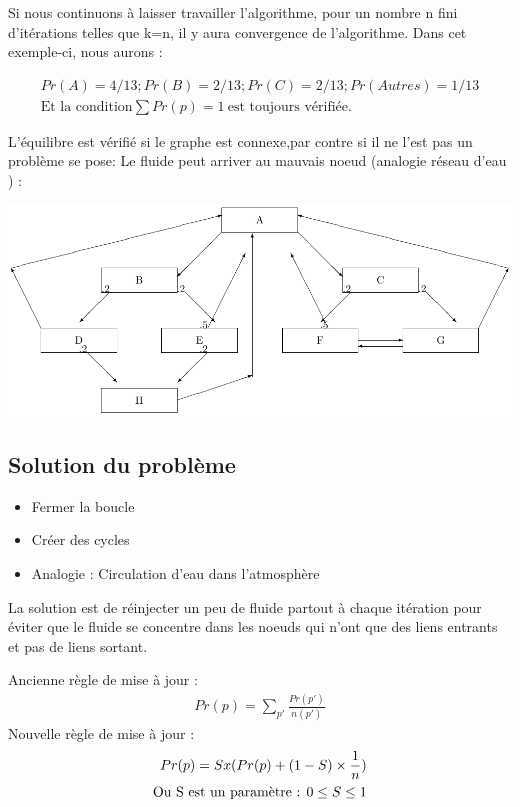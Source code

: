  Si nous continuons à laisser travailler l'algorithme, pour un nombre n fini d'itérations telles que k=n, il y aura convergence de l'algorithme. Dans cet exemple-ci,  nous aurons :

	\begin{align*}
 	Pr(A) = 4/13 ; Pr(B) = 2/13 ; Pr(C) = 2/13 ; Pr(Autres) = 1/13 \\
 	\text{Et la condition} \sum Pr(p) = 1 ~\text{est toujours vérifiée.}
	\end{align*}
 
 L'équilibre est vérifié si le graphe est connexe,par contre si il ne l'est pas un problème se pose: Le fluide peut arriver au mauvais noeud (analogie réseau d'eau )  :

\includegraphics[scale=0.8]{images/24_Nconnexe.pdf}

\subsection*{Solution du problème}
\begin{itemize}
\item Fermer la boucle
\item Créer des cycles
\item Analogie : Circulation d'eau dans l'atmosphère
\end{itemize}
 	La solution est de réinjecter un peu de fluide partout à chaque itération pour éviter que le fluide se concentre dans les noeuds qui n'ont que des liens entrants et pas de liens sortant.

	Ancienne règle de mise à jour :
	\begin{align*}
	Pr(p) =  \sum_ {p'}\frac{Pr(p')}{n(p')}
	\end{align*}
 	Nouvelle règle de mise à jour : \\
	\begin{align*}
         Pr(p) = Sx(Pr(p) + (1-S)  \times \frac{1}{n}) \\
	 \text{Ou S est un paramètre : $ 0 \le S \le 1 $} 
	\end{align*}
        
